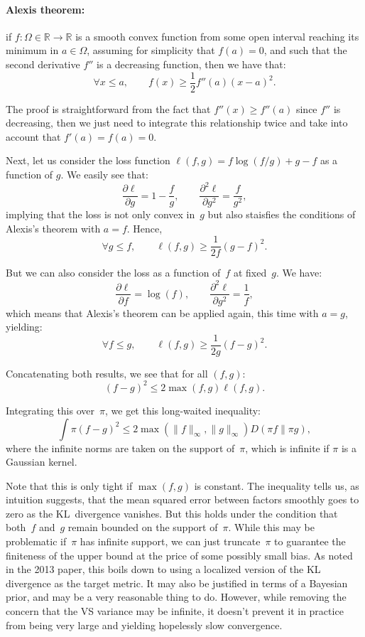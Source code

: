 \documentclass{article}
\begin{document}
\paragraph{Alexis theorem:} if $f:\Omega\in\mathbb{R}\to \mathbb{R}$ is a smooth convex function from some open interval reaching its minimum in $a\in\Omega$, assuming for simplicity that $f(a)=0$, and such that the second derivative $f''$ is a decreasing function, then we have that:
$$
\forall x \leq a,
\qquad
f(x) \geq \frac{1}{2} f''(a) (x - a)^2 .
$$

The proof is straightforward from the fact that $f''(x) \geq f''(a)$ since $f''$ is decreasing, then we just need to integrate this relationship twice and take into account that $f'(a)=f(a)=0$.

Next, let us consider the loss function $\ell(f,g)=f\log(f/g)+g-f$ as a function of $g$. We easily see that:
$$
\frac{\partial\ell}{\partial g} = 1 - \frac{f}{g},
\qquad
\frac{\partial^2\ell}{\partial g^2} = \frac{f}{g^2},
$$
implying that the loss is not only convex in~$g$ but also staisfies the conditions of Alexis's theorem with $a=f$. Hence,
$$
\forall g\leq f,
\qquad
\ell(f, g) \geq \frac{1}{2f} (g - f)^2. 
$$

But we can also consider the loss as a function of~$f$ at fixed~$g$. We have:
$$
\frac{\partial\ell}{\partial f} = \log(f),
\qquad
\frac{\partial^2\ell}{\partial g^2} = \frac{1}{f},
$$
which means that Alexis's theorem can be applied again, this time with $a=g$, yielding:
$$
\forall f\leq g,
\qquad
\ell(f, g) \geq \frac{1}{2g} (f - g)^2. 
$$

Concatenating both results, we see that for all $(f, g)$:
$$
(f-g)^2 \leq 2 \max(f, g)\ell(f, g).
$$

Integrating this over~$\pi$, we get this long-waited inequality:
$$
\int \pi (f-g)^2 \leq 2\max(\|f\|_\infty, \|g\|_\infty) D(\pi f\|\pi g),
$$
where the infinite norms are taken on the support of~$\pi$, which is infinite if $\pi$ is a Gaussian kernel.

Note that this is only tight if $\max(f,g)$ is constant. The inequality tells us, as intuition suggests, that the mean squared error between factors smoothly goes to zero as the KL~divergence vanishes. But this holds under the condition that both~$f$ and~$g$ remain bounded on the support of~$\pi$. While this may be problematic if~$\pi$ has infinite support, we can just truncate~$\pi$ to guarantee the finiteness of the upper bound at the price of some possibly small bias. As noted in the 2013 paper, this boils down to using a localized version of the KL divergence as the target metric. It may also be justified in terms of a Bayesian prior, and may be a very reasonable thing to do. However, while removing the concern that the VS variance may be infinite, it doesn't prevent it in practice from being very large and yielding
hopelessly slow convergence.
\end{document}
